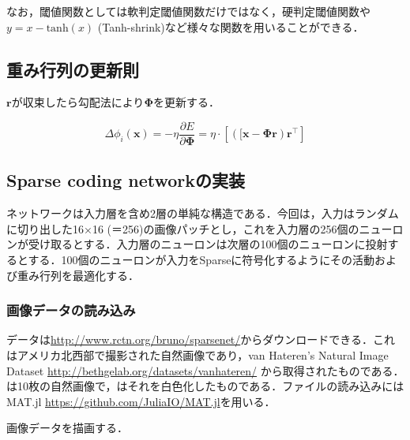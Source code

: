 なお，閾値関数としては軟判定閾値関数だけではなく，硬判定閾値関数や$y=x - \text{tanh}(x)$ (Tanh-shrink)など様々な関数を用いることができる．
\subsection{重み行列の更新則}
$\mathbf{r}$が収束したら勾配法により$\mathbf{\Phi}$を更新する．


\begin{equation}
\Delta \phi_i(\boldsymbol{x}) = -\eta \frac{\partial E}{\partial \mathbf{\Phi}}=\eta\cdot\left[\left([\mathbf{x}-\mathbf{\Phi}\mathbf{r}\right)\mathbf{r}^\top\right]
\end{equation}
\subsection{Sparse coding networkの実装}
ネットワークは入力層を含め2層の単純な構造である．今回は，入力はランダムに切り出した16×16 (＝256)の画像パッチとし，これを入力層の256個のニューロンが受け取るとする．入力層のニューロンは次層の100個のニューロンに投射するとする．100個のニューロンが入力をSparseに符号化するようにその活動および重み行列を最適化する．
\subsubsection{画像データの読み込み}
データは\url{http://www.rctn.org/bruno/sparsenet/}からダウンロードできる．これはアメリカ北西部で撮影された自然画像であり，van Hateren's Natural Image Dataset \url{http://bethgelab.org/datasets/vanhateren/} から取得されたものである．は10枚の自然画像で，はそれを白色化したものである．ファイルの読み込みには MAT.jl \url{https://github.com/JuliaIO/MAT.jl}を用いる．


画像データを描画する．


